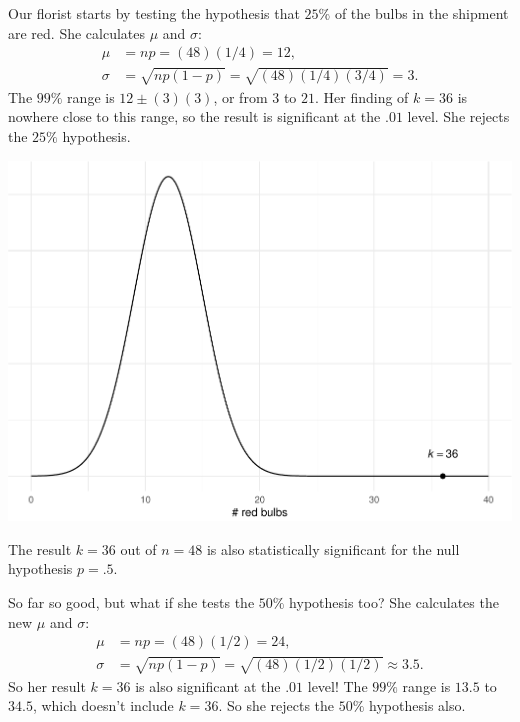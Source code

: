 \documentclass[justified]{tufte-book}
\theoremstyle{definition}
\theoremstyle{definition}
\theoremstyle{definition}
\theoremstyle{remark}
\begin{document}
Our florist starts by testing the hypothesis that \(25\%\) of the bulbs
in the shipment are red. She calculates \(\mu\) and \(\sigma\): \[
  \begin{aligned}
    \mu &= np = (48)(1/4) = 12,\\
    \sigma &= \sqrt{np(1-p)} = \sqrt{(48)(1/4)(3/4)} = 3.
  \end{aligned}
\] The \(99\%\) range is \(12 \pm (3)(3)\), or from \(3\) to \(21\). Her
finding of \(k = 36\) is nowhere close to this range, so the result is
significant at the \(.01\) level. She rejects the \(25\%\) hypothesis.

\begin{marginfigure}
\includegraphics{_main_files/figure-latex/unnamed-chunk-151-1} \caption[The result $k = 36$ out of $n = 48$ is also statistically significant for the null hypothesis $p = .5$]{The result $k = 36$ out of $n = 48$ is also statistically significant for the null hypothesis $p = .5$.}\label{fig:unnamed-chunk-151}
\end{marginfigure}

So far so good, but what if she tests the \(50\%\) hypothesis too? She
calculates the new \(\mu\) and \(\sigma\): \[
  \begin{aligned}
    \mu &= np = (48)(1/2) = 24,\\
    \sigma &= \sqrt{np(1-p)} = \sqrt{(48)(1/2)(1/2)} \approx 3.5.
  \end{aligned}
\] So her result \(k = 36\) is also significant at the \(.01\) level!
The \(99\%\) range is \(13.5\) to \(34.5\), which doesn't include
\(k = 36\). So she rejects the \(50\%\) hypothesis also.
\end{document}
